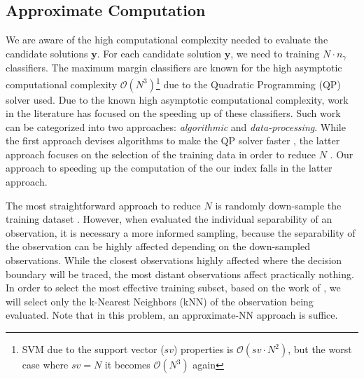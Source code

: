 \subsection{Approximate Computation}
We are aware of the high computational complexity needed to evaluate the candidate solutions $\mathbf{y}$. For each candidate solution $\mathbf{y}$, we need to training $N \cdot n_{\gamma}$ classifiers. The maximum margin classifiers are known for the high asymptotic computational complexity $\mathcal{O}(N^3)$\footnote{SVM due to the support vector ($sv$) properties is $\mathcal{O}(sv \cdot N^2)$, but the worst case where $sv = N$ it becomes $\mathcal{O}(N^3)$ again} due to the Quadratic Programming (QP) solver used. 
Due to the known high asymptotic computational complexity, work in the literature has focused on the speeding up of these classifiers. Such work can be categorized into two approaches: \textit{algorithmic} and \textit{data-processing}. While the first approach devises algorithms to make the QP solver faster \cite{platt1998, keerthi2005}, the latter approach focuses on the selection of the training data in order to reduce $N$ \cite{lee2001,panda2006}. Our approach to speeding up the computation of the our index falls in the latter approach.

The most straightforward approach to reduce $N$ is randomly down-sample the training dataset \cite{lee2001}. However, when evaluated the individual separability of an observation, it is necessary a more informed sampling, because the separability of the observation can be highly affected depending on the down-sampled observations. While the closest observations highly affected where the decision boundary will be traced, the most distant observations affect practically nothing. In order to select the most effective training subset, based on the work of \cite{panda2006}, we will select only the k-Nearest Neighbors (kNN) of the observation being evaluated. Note that in this problem, an approximate-NN approach \cite{gionis1999, schubert2015} is suffice.


\newpage